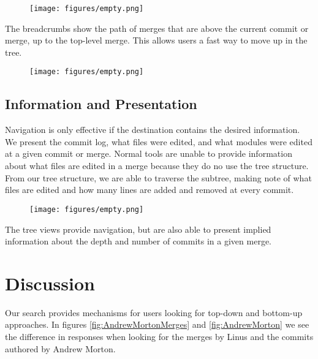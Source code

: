 \documentclass[conference, draftclsnofoot]{IEEEtran}
\begin{document}
\begin{figure}[h!]
	\centering
	\texttt{[image: figures/empty.png]}
	\caption{}
	\label{}
\end{figure}


The breadcrumbs show the path of merges that are above the current commit or
merge, up to the top-level merge. This allows users a fast way to move up in
the tree.

\begin{figure}[h!]
	\centering
	\texttt{[image: figures/empty.png]}
	\caption{}
	\label{}
\end{figure}


\subsection{Information and Presentation}

Navigation is only effective if the destination contains the desired
information. We present the commit log, what files were edited, and what
modules were edited at a given commit or merge. Normal tools are unable to
provide information about what files are edited in a merge because they do no
use the tree structure. From our tree structure, we are able to traverse the
subtree, making note of what files are edited and how many lines are added and
removed at every commit.

\begin{figure}[h!]
	\centering
	\texttt{[image: figures/empty.png]}
	\caption{}
	\label{}
\end{figure}

The tree views provide navigation, but are also able to present implied
information about the depth and number of commits in a given merge.

\section{Discussion}

Our search provides mechanisms for users looking for top-down and bottom-up
approaches. In figures \ref{fig:AndrewMortonMerges} and \ref{fig:AndrewMorton}
we see the difference in responses when looking for the merges by Linus and the
commits authored by Andrew Morton.

\end{document}

